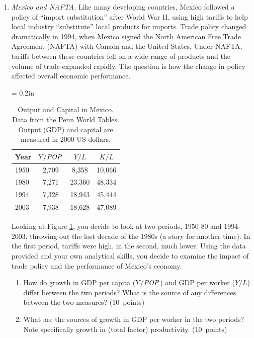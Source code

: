 \documentclass[letterpaper,12pt]{article}
\newcommand{\POP}{\mbox{\em POP\/}}
\begin{document}
\begin{enumerate}
\item {\it Mexico and NAFTA.\/} 
Like many developing countries, 
Mexico followed a policy of ``import substitution'' after World War II, 
using high tariffs to help local industry ``substitute'' 
local products for imports.  
Trade policy changed dramatically in 1994,
when Mexico signed the North American Free Trade Agreement (NAFTA)
with Canada and the United States.
Under NAFTA, tariffs between these countries fell on a wide range 
of products and the volume of trade expanded rapidly.  
The question is how the change in policy affected overall 
economic performance.  
 
 \begin{table}
    \centering 
    \tabcolsep = 0.2in
    \begin{tabular}{lccc}
    \hline\hline
    Year    &  $Y/\POP $  &  $Y/L$  &  $K/L$  \\
    \hline\hline
    1950 &  2,709 &  8,358   &  10,066 \\
    1980 &  7,271 &  23,360  &  48,334  \\
    1994 &  7,328 &  18,943  &  45,444 \\
    2003 &  7,938 &  18,628  &  47,089 \\
    \hline\hline
    \end{tabular}
    \caption{Output and Capital in Mexico.
    Data from the Penn World Tables.  Output (GDP) and capital
    are measured in 2000 US dollars.}
    \label{tab:mexico}    
\end{table}

%
Looking at Figure \ref{tab:mexico}, you decide to look at two periods, 
1950-80 and 1994-2003, throwing out the lost decade of the 1980s 
(a story for another time).  
In the first period, tariffs were high, in the second, much lower.  
Using the data provided and your own analytical skills, you decide to 
examine the impact of trade policy and the performance 
of Mexico's economy.  

\begin{enumerate}

\item How do growth in GDP per capita ($Y/\POP$) 
and GDP per worker ($Y/L$) differ between the two periods?  
What is the source of any differences between the two measures?    
(10~points)

\item What are the sources of growth in GDP per worker 
in the two periods?  
Note specifically growth in (total factor) productivity.  
(10~points)


\end{enumerate}
\end{enumerate}
\end{document}
